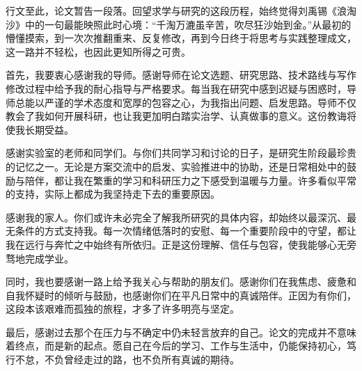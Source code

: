 行文至此，论文暂告一段落。回望求学与研究的这段历程，始终觉得刘禹锡《浪淘沙》中的一句最能映照此时心境：“千淘万漉虽辛苦，吹尽狂沙始到金。”从最初的懵懂摸索，到一次次推翻重来、反复修改，再到今日终于将思考与实践整理成文，这一路并不轻松，也因此更知所得之可贵。

首先，我要衷心感谢我的导师。感谢导师在论文选题、研究思路、技术路线与写作修改过程中给予我的耐心指导与严格要求。每当我在研究中感到迟疑与困惑时，导师总能以严谨的学术态度和宽厚的包容之心，为我指出问题、启发思路。导师不仅教会了我如何开展科研，也让我更加明白踏实治学、认真做事的意义。这份教诲将使我长期受益。

感谢实验室的老师和同学们。与你们共同学习和讨论的日子，是研究生阶段最珍贵的记忆之一。无论是方案交流中的启发、实验推进中的协助，还是日常相处中的鼓励与陪伴，都让我在繁重的学习和科研压力之下感受到温暖与力量。许多看似平常的支持，实际上都成为我坚持走下去的重要原因。

感谢我的家人。你们或许未必完全了解我所研究的具体内容，却始终以最深沉、最无条件的方式支持我。每一次情绪低落时的安慰、每一个重要阶段中的守望，都让我在远行与奔忙之中始终有所依归。正是这份理解、信任与包容，使我能够心无旁骛地完成学业。

同时，我也要感谢一路上给予我关心与帮助的朋友们。感谢你们在我焦虑、疲惫和自我怀疑时的倾听与鼓励，也感谢你们在平凡日常中的真诚陪伴。正因为有你们，这段本该艰难而孤独的旅程，才多了许多明亮与坚定。

最后，感谢过去那个在压力与不确定中仍未轻言放弃的自己。论文的完成并不意味着终点，而是新的起点。愿自己在今后的学习、工作与生活中，仍能保持初心，笃行不怠，不负曾经走过的路，也不负所有真诚的期待。
